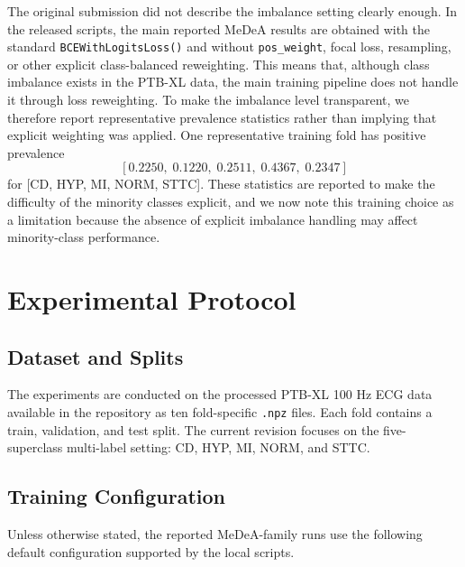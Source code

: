 \documentclass[11pt]{article}
\begin{document}
The original submission did not describe the imbalance setting clearly enough. In the released scripts, the main reported MeDeA results are obtained with the standard \texttt{BCEWithLogitsLoss()} and without \texttt{pos\_weight}, focal loss, resampling, or other explicit class-balanced reweighting. This means that, although class imbalance exists in the PTB-XL data, the main training pipeline does not handle it through loss reweighting. To make the imbalance level transparent, we therefore report representative prevalence statistics rather than implying that explicit weighting was applied. One representative training fold has positive prevalence
\[
[0.2250,\;0.1220,\;0.2511,\;0.4367,\;0.2347]
\]
for [CD, HYP, MI, NORM, STTC]. These statistics are reported to make the difficulty of the minority classes explicit, and we now note this training choice as a limitation because the absence of explicit imbalance handling may affect minority-class performance.

\section{Experimental Protocol}

\subsection{Dataset and Splits}

The experiments are conducted on the processed PTB-XL 100 Hz ECG data available in the repository as ten fold-specific \texttt{.npz} files. Each fold contains a train, validation, and test split. The current revision focuses on the five-superclass multi-label setting: CD, HYP, MI, NORM, and STTC.

\subsection{Training Configuration}

Unless otherwise stated, the reported MeDeA-family runs use the following default configuration supported by the local scripts.
\end{document}
